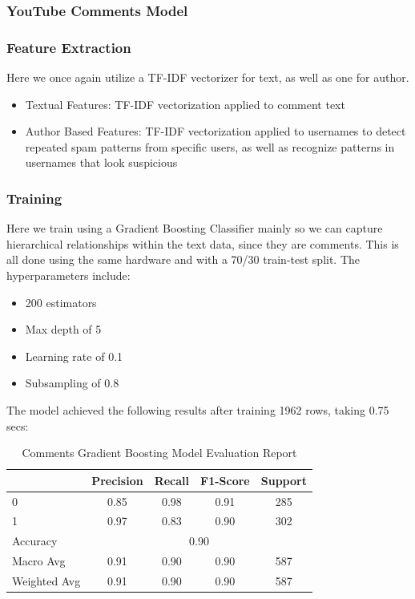 \documentclass{article}
\begin{document}
\subsubsection{YouTube Comments Model}
\subsubsection*{Feature Extraction}

Here we once again utilize a TF-IDF vectorizer for text, as well as one for author.

\begin{itemize}
    \item Textual Features: TF-IDF vectorization applied to comment text
    \item Author Based Features: TF-IDF vectorization applied to usernames to detect repeated spam patterns from specific users, as well as recognize patterns in usernames that look suspicious
\end{itemize}

\subsubsection*{Training}

Here we train using a Gradient Boosting Classifier mainly so we can capture hierarchical relationships within the text data, since they are comments. This is all done using the same hardware and with a 70/30 train-test split. The hyperparameters include:

\begin{itemize}
    \item 200 estimators
    \item Max depth of 5
    \item Learning rate of 0.1
    \item Subsampling of 0.8
\end{itemize}

The model achieved the following results after training 1962 rows, taking 0.75 secs:

\begin{table}[htbp]
    \centering
    \caption{Comments Gradient Boosting Model Evaluation Report}
    \begin{tabular}{l c c c c}
    \toprule
     & Precision & Recall & F1-Score & Support \\
    \midrule
    0 & 0.85 & 0.98 & 0.91 & 285 \\
    1 & 0.97 & 0.83 & 0.90 & 302 \\
    \midrule
    Accuracy & \multicolumn{4}{c}{0.90} \\
    Macro Avg & 0.91 & 0.90 & 0.90 & 587 \\
    Weighted Avg & 0.91 & 0.90 & 0.90 & 587 \\
    \bottomrule
    \end{tabular}
    \label{tab:gradient_boosting_evaluation}
\end{table}
\end{document}
